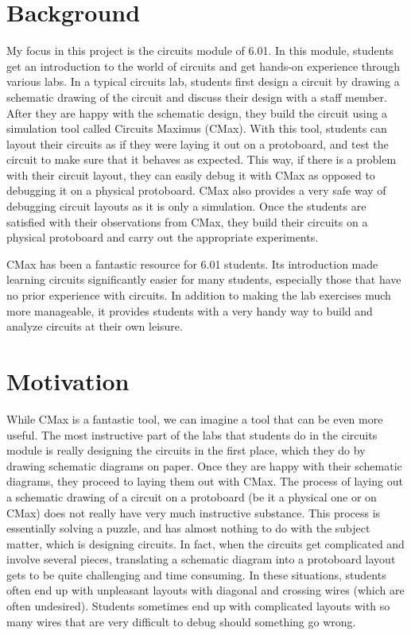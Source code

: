 \documentclass[12pt, doublespacing]{amsart}
\begin{document}
\section{Background}
\label{sec:background}

My focus in this project is the circuits module of 6.01. In this module, students get an introduction to the world of circuits and get hands-on experience through various labs. In a typical circuits lab, students first design a circuit by drawing a schematic drawing of the circuit and discuss their design with a staff member. After they are happy with the schematic design, they build the circuit using a simulation tool called Circuits Maximus (CMax)\cite{cmax}. With this tool, students can layout their circuits as if they were laying it out on a protoboard, and test the circuit to make sure that it behaves as expected. This way, if there is a problem with their circuit layout, they can easily debug it with CMax as opposed to debugging it on a physical protoboard. CMax also provides a very safe way of debugging circuit layouts as it is only a simulation. Once the students are satisfied with their observations from CMax, they build their circuits on a physical protoboard and carry out the appropriate experiments.

CMax has been a fantastic resource for 6.01 students. Its introduction made learning circuits significantly easier for many students, especially those that have no prior experience with circuits. In addition to making the lab exercises much more manageable, it provides students with a very handy way to build and analyze circuits at their own leisure.

\section{Motivation}
\label{sec:motivation}

While CMax is a fantastic tool, we can imagine a tool that can be even more useful. The most instructive part of the labs that students do in the circuits module is really designing the circuits in the first place, which they do by drawing schematic diagrams on paper. Once they are happy with their schematic diagrams, they proceed to laying them out with CMax. The process of laying out a schematic drawing of a circuit on a protoboard (be it a physical one or on CMax) does not really have very much instructive substance. This process is essentially solving a puzzle, and has almost nothing to do with the subject matter, which is designing circuits. In fact, when the circuits get complicated and involve several pieces, translating a schematic diagram into a protoboard layout gets to be quite challenging and time consuming. In these situations, students often end up with unpleasant layouts with diagonal and crossing wires (which are often undesired). Students sometimes end up with complicated layouts with so many wires that are very difficult to debug should something go wrong.
\end{document}
